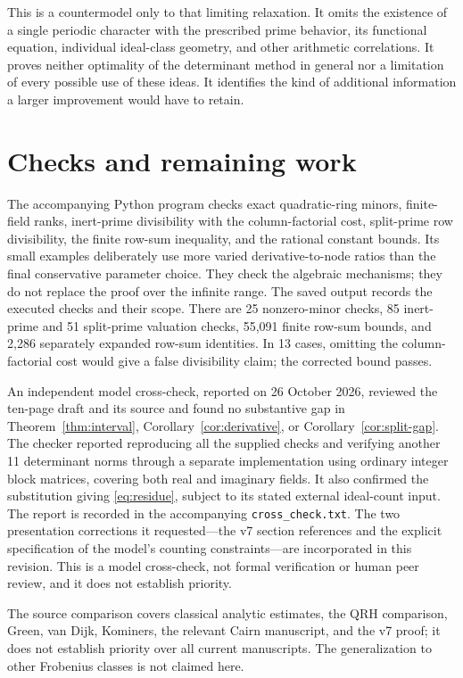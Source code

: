 \documentclass[11pt]{article}
\begin{document}
This is a countermodel only to that limiting relaxation. It omits
the existence of a single periodic character with the prescribed
prime behavior, its functional equation, individual ideal-class
geometry, and other arithmetic correlations. It proves neither
optimality of the determinant method in general nor a limitation
of every possible use of these ideas. It identifies the kind of
additional information a larger improvement would have to retain.

\section{Checks and remaining work}\label{sec:checks}
The accompanying Python program checks exact quadratic-ring minors,
finite-field ranks, inert-prime divisibility with the column-factorial
cost, split-prime row divisibility, the finite row-sum inequality, and
the rational constant bounds. Its small examples deliberately use
more varied derivative-to-node ratios than the final conservative
parameter choice. They check the algebraic mechanisms; they do not
replace the proof over the infinite range. The saved output records
the executed checks and their scope.
There are 25 nonzero-minor checks, 85 inert-prime and 51 split-prime
valuation checks, 55,091 finite row-sum bounds, and 2,286 separately
expanded row-sum identities. In 13 cases, omitting the column-factorial
cost would give a false divisibility claim; the corrected bound passes.

An independent model cross-check, reported on 26 October 2026,
reviewed the ten-page draft and its source and found no substantive
gap in Theorem~\ref{thm:interval}, Corollary~\ref{cor:derivative}, or
Corollary~\ref{cor:split-gap}. The checker reported reproducing all
the supplied checks and verifying another 11 determinant norms through
a separate implementation using ordinary integer block matrices,
covering both real and imaginary fields. It also confirmed the
substitution giving \eqref{eq:residue}, subject to its stated external
ideal-count input. The report is recorded in the accompanying
\texttt{cross\_check.txt}. The two presentation corrections it
requested---the v7 section references and the explicit specification
of the model's counting constraints---are incorporated in this
revision. This is a model cross-check, not formal verification or
human peer review, and it does not establish priority.

The source comparison covers classical analytic estimates, the QRH
comparison, Green, van Dijk, Kominers, the relevant Cairn manuscript,
and the v7 proof; it does not establish priority over all current
manuscripts. The generalization to other Frobenius
classes is not claimed here.
\end{document}
